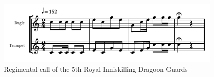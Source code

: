 \vspace{10mm}

\begin{figure}[h]
  \centering
  \includegraphics[width=\textwidth]{gazette/5ridg-call.pdf}
  \caption*{Regimental call of the 5th Royal Inniskilling Dragoon Guards}
\end{figure}

\vfill

\pagebreak

\vspace*{10mm}


\vfill

